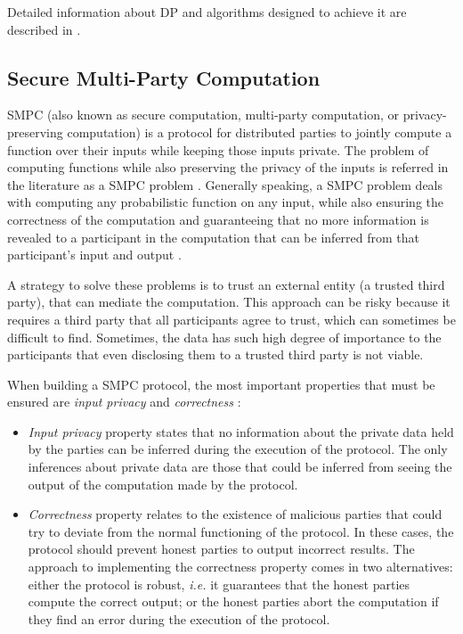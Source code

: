 Detailed information about \ac{DP} and algorithms designed to achieve it are described in \cite{dwork2014algorithmic}.


\subsection{Secure Multi-Party Computation} 
\label{ssec:SecureMultiPartyComputation}


\acf{SMPC} (also known as secure computation, multi-party computation, or privacy-preserving computation) is a protocol for distributed parties to jointly compute a function over their inputs while keeping those inputs private. The problem of computing functions while also preserving the privacy of the inputs is referred in the literature as a \ac{SMPC} problem \cite{yao1982protocols}. Generally speaking, a \ac{SMPC} problem deals with computing any probabilistic function on any input, while also ensuring the correctness of the computation and guaranteeing that no more information is revealed to a participant in the computation that can be inferred from that participant's input and output \cite{goldwasser1997multi}. 

A strategy to solve these problems is to trust an external entity (a trusted third party), that can mediate the computation. This approach can be risky because it requires a third party that all participants agree to trust, which can sometimes be difficult to find. Sometimes, the data has such high degree of importance to the participants that even disclosing them to a trusted third party is not viable.

When building a \ac{SMPC} protocol, the most important properties that must be ensured are \textit{input privacy} and \textit{correctness} \cite{goldreich1998secure}:

\begin{itemize}
    \setlength\itemsep{1em}

    \item \textit{Input privacy} property states that no information about the private data held by the parties can be inferred during the execution of the protocol. The only inferences about private data are those that could be inferred from seeing the output of the computation made by the protocol.

    \item \textit{Correctness} property relates to the existence of malicious parties that could try to deviate from the normal functioning of the protocol. In these cases, the protocol should prevent honest parties to output incorrect results. The approach to implementing the correctness property comes in two alternatives: either the protocol is robust, \textit{i.e.} it guarantees that the honest parties compute the correct output; or the honest parties abort the computation if they find an error during the execution of the protocol.
\end{itemize}

